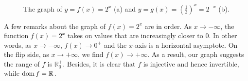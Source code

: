 %

\begin{figure}
\centering
\centerline{
\hspace{1cm}
}	
\caption{The graph of $y=f(x)=2^x$ (a) and $y=g(x)=\left(\frac{1}{2}\right)^{x} = 2^{-x}$ (b).}
\end{figure}


A few remarks about the graph of $f(x) = 2^{x}$  are in order.  As $x \rightarrow -\infty$, the function $f(x) = 2^{x}$ takes on values that are increasingly closer to 0.  In other words, as $x \rightarrow -\infty$, $f(x) \rightarrow 0^+$ and the $x$-axis is a horizontal asymptote.  On the flip side, as $x \rightarrow +\infty$, we find $f(x) \rightarrow +\infty$. As a result, our graph suggests the range of $f$ is $\mathbb{R}^+_0$.  Besides, it is clear that $f$ is injective and hence invertible, while $\text{dom}{\,}f=\mathbb{R}$. 


